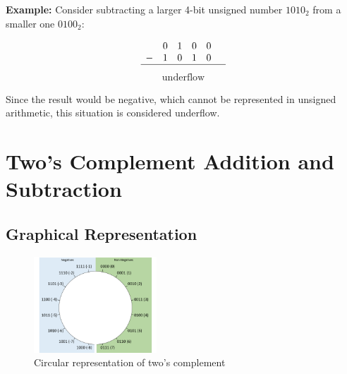 \documentclass[12pt,openany, tikz,border=10pt]{book}
\begin{document}
\textbf{Example:} Consider subtracting a larger 4-bit unsigned number \(1010_2\) from a smaller one \(0100_2\):

\[
\begin{array}{cccccc}
 & 0 & 1 & 0 & 0 & \\
- & 1 & 0 & 1 & 0 & \\
\hline
\end{array}\]
\vspace{-15px}
\begin{align*}
    \text{underflow}
\end{align*} 

Since the result would be negative, which cannot be represented in unsigned arithmetic, this situation is considered underflow.


\section{Two’s Complement
Addition and Subtraction}
\subsection*{Graphical Representation}

\begin{figure} %
  \centering
  \includegraphics[width=0.41\textwidth]{circle-twoscomplement.png} %
  \caption*{Circular representation of two's complement}
\end{figure}
\end{document}
